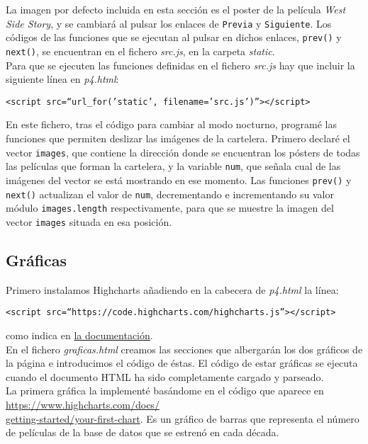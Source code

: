 \documentclass{article}
\begin{document}
La imagen por defecto incluida en esta sección es el poster de la película \textit{West Side Story}, y se cambiará al pulsar los enlaces de \texttt{Previa} y \texttt{Siguiente}. Los códigos de las funciones que se ejecutan al pulsar en dichos enlaces, \texttt{prev()} y \texttt{next()}, se encuentran en el fichero \textit{src.js}, en la carpeta \textit{static}.\\

Para que se ejecuten las funciones definidas en el fichero \textit{src.js} hay que incluir la siguiente línea en \textit{p4.html}:
\begin{center}
  \texttt{<script src=``{{url\_for('static', filename='src.js')}}''></script>}
\end{center}

En este fichero, tras el código para cambiar al modo nocturno, programé las funciones que permiten deslizar las imágenes de la cartelera. Primero declaré el vector \texttt{images}, que contiene la dirección donde se encuentran los pósters de todas las películas que forman la cartelera, y la variable \texttt{num}, que señala cual de las imágenes del vector se está mostrando en ese momento. Las funciones \texttt{prev()} y \texttt{next()} actualizan el valor de \texttt{num}, decrementando e incrementando su valor módulo \texttt{images.length} respectivamente, para que se muestre la imagen del vector \texttt{images} situada en esa posición.

\subsection{Gráficas}

Primero instalamos Highcharts añadiendo en la cabecera de \textit{p4.html} la línea:
\vspace{-1mm}
\begin{center}
  \texttt{<script src=``https://code.highcharts.com/highcharts.js''></script>}
\end{center}

como indica en \href{https://www.highcharts.com/docs/getting-started/installation}{la documentación}.\\

En el fichero \textit{graficas.html} creamos las secciones que albergarán los dos gráficos de la página e introducimos el código de éstas. El código de estar gráficas se ejecuta cuando el documento HTML ha sido completamente cargado y parseado.\\

La primera gráfica la implementé basándome en el código que aparece en \href{https://www.highcharts.com/docs/getting-started/your-first-chart}{https://www.highcharts.com/docs/\\getting-started/your-first-chart}. Es un gráfico de barras que representa el número de películas de la base de datos que se estrenó en cada década.\\
\end{document}
